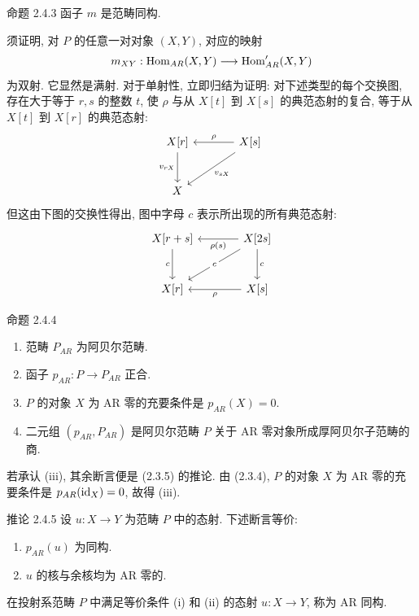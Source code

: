 \begin{statement}{命题 2.4.3}
函子 $m$ 是范畴同构.
\end{statement}

\begin{prooftext}[证明]
须证明, 对 $P$ 的任意一对对象 $(X,Y)$, 对应的映射
\[
m_{XY}:\operatorname{Hom}_{AR}(X,Y)\longrightarrow\operatorname{Hom}'_{AR}(X,Y)
\]
为双射. 它显然是满射. 对于单射性, 立即归结为证明: 对下述类型的每个交换图, 存在大于等于 $r,s$ 的整数 $t$, 使 $\rho$ 与从 $X[t]$ 到 $X[s]$ 的典范态射的复合, 等于从 $X[t]$ 到 $X[r]$ 的典范态射:
\[
\begin{tikzcd}[column sep=large,row sep=large]
X[r] \arrow[d,"{v_{rX}}"'] & X[s] \arrow[l,"\rho"'] \arrow[dl,"{v_{sX}}"]\\
X & {}
\end{tikzcd}
\]
但这由下图的交换性得出, 图中字母 $c$ 表示所出现的所有典范态射:
\[
\begin{tikzcd}[column sep=large,row sep=large]
X[r+s] \arrow[d,"c"'] & X[2s] \arrow[l,"\rho(s)"] \arrow[d,"c"] \arrow[dl,"c" description]\\
X[r] & X[s] \arrow[l,"\rho"]
\end{tikzcd}
\]
\end{prooftext}

\begin{statement}{命题 2.4.4}
\begin{enumerate}[label=(\roman*)]
\item 范畴 $P_{AR}$ 为阿贝尔范畴.
\item 函子 $p_{AR}:P\to P_{AR}$ 正合.
\item $P$ 的对象 $X$ 为 AR 零的充要条件是 $p_{AR}(X)=0$.
\item 二元组 $(p_{AR},P_{AR})$ 是阿贝尔范畴 $P$ 关于 AR 零对象所成厚阿贝尔子范畴的商.
\end{enumerate}
\end{statement}

\begin{prooftext}[证明]
若承认 (iii), 其余断言便是 (2.3.5) 的推论. 由 (2.3.4), $P$ 的对象 $X$ 为 AR 零的充要条件是 $p_{AR}(\operatorname{id}_X)=0$, 故得 (iii).
\end{prooftext}

\begin{statement}{推论 2.4.5}
设 $u:X\to Y$ 为范畴 $P$ 中的态射. 下述断言等价:
\begin{enumerate}[label=(\roman*)]
\item $p_{AR}(u)$ 为同构.
\item $u$ 的核与余核均为 AR 零的.
\end{enumerate}
在投射系范畴 $P$ 中满足等价条件 (i) 和 (ii) 的态射 $u:X\to Y$, 称为 AR 同构.
\end{statement}

